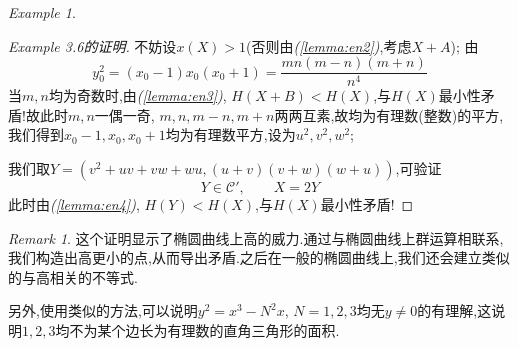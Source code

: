 \documentclass[12pt,A4paper,oneside,reqno]{amsart}
\numberwithin{equation}{section}
\theoremstyle{definition}
\theoremstyle{plain}
\theoremstyle{plain}
\numberwithin{equation}{section}
\theoremstyle{remark}
\newtheorem{remark}[theorem]{Remark}
\newtheorem{eg}[theorem]{Example}
\begin{document}
\begin{eg}
\begin{proof}[Example 3.6的证明]
		不妨设$x(X)>1$(否则由\textit{(\ref{lemma:en2})},考虑$X+A$);
		由
		$$y_0^2=(x_0-1)x_0(x_0+1)=\frac{mn(m-n)(m+n)}{n^4}$$
		当$m,n$均为奇数时,由\textit{(\ref{lemma:en3})}, $H(X+B)<H(X)$,与$H(X)$最小性矛盾!故此时$m,n$一偶一奇, $m,n,m-n,m+n$两两互素,故均为有理数(整数)的平方,我们得到$x_0-1,x_0,x_0+1$均为有理数平方,设为$u^2,v^2,w^2$;
		
		我们取$Y=(v^2+uv+vw+wu,(u+v)(v+w)(w+u))$,可验证
		$$Y \in \mathcal{C}', \qquad X=2Y$$
		此时由\textit{(\ref{lemma:en4})}, $H(Y)<H(X)$,与$H(X)$最小性矛盾!
	\end{proof}
\begin{remark}
	这个证明显示了椭圆曲线上高的威力.通过与椭圆曲线上群运算相联系,我们构造出高更小的点,从而导出矛盾.之后在一般的椭圆曲线上,我们还会建立类似的与高相关的不等式.
	
	另外,使用类似的方法,可以说明$y^2=x^3-N^2x$, $N=1,2,3$均无$y\neq0$的有理解,这说明$1,2,3$均不为某个边长为有理数的直角三角形的面积.
\end{remark}
\end{eg}
\clearpage
\end{document}
